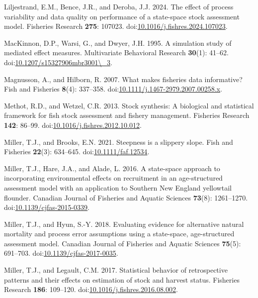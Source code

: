 \documentclass[
  12pt,
]{article}
\newlength{\cslhangindent}
\newenvironment{CSLReferences}[2] %
 {\begin{list}{}{%
  \setlength{\itemindent}{0pt} %
  \setlength{\leftmargin}{0pt} %
  \setlength{\parsep}{0pt} %
  \ifodd #1
   \setlength{\leftmargin}{\cslhangindent} %
   \setlength{\itemindent}{-1\cslhangindent} %
  \fi
  \setlength{\itemsep}{#2\baselineskip}}} %
 {\end{list}} %
\begin{document}
\begin{CSLReferences}{1}{0}
Liljestrand, E.M., Bence, J.R., and Deroba, J.J. 2024. The effect of
process variability and data quality on performance of a state-space
stock assessment model. Fisheries Research \textbf{275}: 107023.
doi:\href{https://doi.org/10.1016/j.fishres.2024.107023}{10.1016/j.fishres.2024.107023}.

MacKinnon, D.P., Warsi, G., and Dwyer, J.H. 1995. A simulation study of
mediated effect measures. Multivariate Behavioral Research
\textbf{30}(1): 41--62.
doi:\href{https://doi.org/10.1207/s15327906mbr3001/_3}{10.1207/s15327906mbr3001\textbackslash\_3}.

Magnusson, A., and Hilborn, R. 2007. What makes fisheries data
informative? Fish and Fisheries \textbf{8}(4): 337--358.
doi:\href{https://doi.org/10.1111/j.1467-2979.2007.00258.x}{10.1111/j.1467-2979.2007.00258.x}.

Methot, R.D., and Wetzel, C.R. 2013. Stock synthesis: A biological and
statistical framework for fish stock assessment and fishery management.
Fisheries Research \textbf{142}: 86--99.
doi:\href{https://doi.org/10.1016/j.fishres.2012.10.012}{10.1016/j.fishres.2012.10.012}.

Miller, T.J., and Brooks, E.N. 2021. Steepness is a slippery slope. Fish
and Fisheries \textbf{22}(3): 634--645.
doi:\href{https://doi.org/10.1111/faf.12534}{10.1111/faf.12534}.

Miller, T.J., Hare, J.A., and Alade, L. 2016. A state-space approach to
incorporating environmental effects on recruitment in an age-structured
assessment model with an application to {S}outhern {N}ew {E}ngland
yellowtail flounder. Canadian Journal of Fisheries and Aquatic Sciences
\textbf{73}(8): 1261--1270.
doi:\href{https://doi.org/10.1139/cjfas-2015-0339}{10.1139/cjfas-2015-0339}.

Miller, T.J., and Hyun, S.-Y. 2018. Evaluating evidence for alternative
natural mortality and process error assumptions using a state-space,
age-structured assessment model. Canadian Journal of Fisheries and
Aquatic Sciences \textbf{75}(5): 691--703.
doi:\href{https://doi.org/10.1139/cjfas-2017-0035}{10.1139/cjfas-2017-0035}.

Miller, T.J., and Legault, C.M. 2017. Statistical behavior of
retrospective patterns and their effects on estimation of stock and
harvest status. Fisheries Research \textbf{186}: 109--120.
doi:\href{https://doi.org/10.1016/j.fishres.2016.08.002}{10.1016/j.fishres.2016.08.002}.


\end{CSLReferences}
\end{document}
